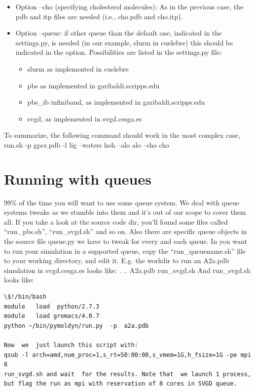 \documentclass[10pt, oneside, pdftex]{article}
\begin{document}
\begin{itemize}
\begin{itemize}
{  structural waters: ion-local.pdb  and ion-local.itp.}  
\item{Option --cho
  (specifying cholesterol molecules): As in the previous case, the pdb
  and  itp files  are needed  (i.e., cho.pdb  and cho.itp).}
\item{Option --queue:  if other  queue than  the  default one,  indicated in  the
  settings.py,  is needed  (in our  example, slurm  in  cuelebre) this
  should be indicated  in the option. Possibilities are  listed in the
  settings.py  file:}
\begin{itemize}
\item{slurm  as  implemented in  cuelebre}
\item{pbs  as  implemented  in   garibaldi.scripps.edu}
\item{pbs\_ib   infiniband,  as implemented  in  garibaldi.scripps.edu}
\item{svgd, as  implemented  in svgd.cesga.es}
\end{itemize}
\end{itemize}
\end{itemize}

To summarize, the following command should work in the most complex case,
run.sh -p gpcr.pdb -l lig --waters hoh --alo alo --cho cho

\section*{Running with queues}
99\% of the time you will want  to use some queue system. We deal with
queue systems tweaks as we stumble into them and it's out of our scope
to cover them all.  If you take a look at the  source code dir, you'll
found some  files called ``run\_pbs.sh'',  ``run\_svgd.sh'' and so  on. Also
there are specific  queue objects in the source  file queue.py we have
to tweak for every and each queue.  In you want to run your simulation
in a supported queue, copy the ``run\_queuename.sh'' file to your working
directory, and edit it. E.g.  the workdir to run an A2a.pdb simulation
in svgd.cesga.es looks like:  . .. A2a.pdb run\_svgd.sh And run\_svgd.sh
looks   like:  
\begin{Verbatim}
\$!/bin/bash   
module   load  python/2.7.3
module   load gromacs/4.0.7
python ~/bin/pymoldyn/run.py  -p  a2a.pdb 

Now  we  just launch this script with: 
qsub -l arch=amd,num_proc=1,s_rt=50:00:00,s_vmem=1G,h_fsize=1G -pe mpi 8
run_svgd.sh and wait  for the results. Note that  we launch 1 process,
but flag the run as mpi with reservation of 8 cores in SVGD queue.
\end{Verbatim}
\end{document}
